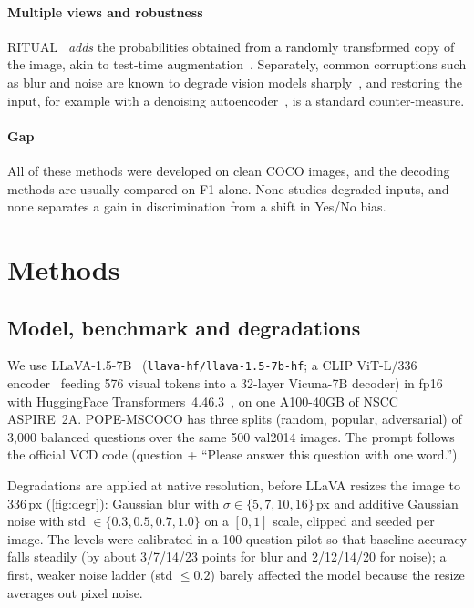 \documentclass[10pt,a4paper]{article}
\newcommand{\code}[1]{\texttt{\small #1}}
\begin{document}
\paragraph{Multiple views and robustness} RITUAL~\citep{woo2024ritual} \emph{adds} the probabilities obtained from a randomly transformed copy of the image, akin to test-time augmentation~\citep{shanmugam2021tta}. Separately, common corruptions such as blur and noise are known to degrade vision models sharply~\citep{hendrycks2019corruptions}, and restoring the input, for example with a denoising autoencoder~\citep{vincent2008dae}, is a standard counter-measure.

\paragraph{Gap} All of these methods were developed on clean COCO images, and the decoding methods are usually compared on F1 alone. None studies degraded inputs, and none separates a gain in discrimination from a shift in Yes/No bias.

\section{Methods}\label{sec:methods}

\subsection{Model, benchmark and degradations}
We use LLaVA-1.5-7B~\citep{liu2024improved} (\code{llava-hf/llava-1.5-7b-hf}; a CLIP ViT-L/336 encoder~\citep{radford2021clip} feeding 576 visual tokens into a 32-layer Vicuna-7B decoder) in fp16 with HuggingFace Transformers~4.46.3~\citep{wolf2020transformers}, on one A100-40GB of NSCC ASPIRE~2A. POPE-MSCOCO has three splits (random, popular, adversarial) of 3{,}000 balanced questions over the same 500 val2014 images. The prompt follows the official VCD code (question + ``Please answer this question with one word.'').

Degradations are applied at native resolution, before LLaVA resizes the image to 336\,px (\cref{fig:degr}): Gaussian blur with $\sigma\in\{5,7,10,16\}$\,px and additive Gaussian noise with std $\in\{0.3,0.5,0.7,1.0\}$ on a $[0,1]$ scale, clipped and seeded per image. The levels were calibrated in a 100-question pilot so that baseline accuracy falls steadily (by about 3/7/14/23 points for blur and 2/12/14/20 for noise); a first, weaker noise ladder (std $\le0.2$) barely affected the model because the resize averages out pixel noise.
\end{document}
